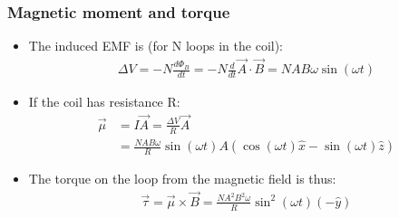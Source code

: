 \documentclass[aspectratio=169,
hyperref={colorlinks,urlcolor=blue}
]{beamer}
\begin{document}
\subsubsection{Magnetic moment and torque}
\label{subsubsec:magneticmomentandtorque}
{\scriptsize
\begin{itemize}
\item<1-> The induced EMF is (for N loops in the coil):
\begin{align*}
\Delta V = -N \frac{d\Phi_B}{dt}= -N \frac{d}{dt}\vec A\cdot \vec B=NAB\omega\sin(\omega t)
\end{align*}
\item<2-> If the coil has resistance R:
\begin{align*}
\vec\mu&=I\vec A = \frac{\Delta V}{R}\vec A\\
&=\frac{NAB\omega}{R}\sin(\omega t)A(\cos(\omega t)\hat x - \sin(\omega t)\hat z)
\end{align*}
\item<3-> The torque on the loop from the magnetic field is thus:
\begin{align*}
\vec\tau=\vec\mu\times\vec B=\frac{NA^2B^2\omega}{R}\sin^2(\omega t)(-\hat y)
\end{align*}
\end{itemize}

}
\end{document}
